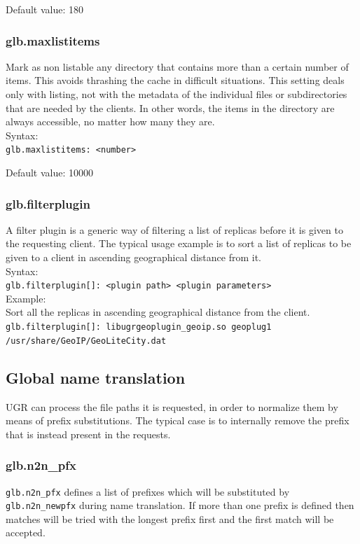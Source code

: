 \documentclass[12pt]{article} %
\begin{document}
Default value: 180

\subsubsection{glb.maxlistitems}
Mark as non listable any directory that contains more than a certain number of items. This avoids thrashing the cache in difficult situations. This setting deals only with listing, not with the metadata of the individual files or subdirectories that are needed by the clients. In other words, the items in the directory are always accessible, no matter how many they are.\\
Syntax:\\
\lstinline"glb.maxlistitems: <number>"


Default value: 10000

\subsubsection{glb.filterplugin}
A filter plugin is a generic way of filtering a list of replicas before it is given to the requesting client.
The typical usage example is to sort a list of replicas to be given to a client in ascending geographical distance from it.
\\
Syntax:\\
\lstinline"glb.filterplugin[]: <plugin path> <plugin parameters>"
\\
Example:\\
Sort all the replicas in ascending geographical distance from the client.
\lstinline"glb.filterplugin[]: libugrgeoplugin_geoip.so geoplug1 /usr/share/GeoIP/GeoLiteCity.dat"

\subsection{\label{globalxlation}Global name translation}

UGR can process the file paths it is requested, in order to normalize them by means of prefix substitutions. The typical case is to internally remove the prefix that is instead present in the requests.

\subsubsection{glb.n2n\_pfx}

\lstinline"glb.n2n_pfx" defines a list of prefixes which will be substituted by \lstinline"glb.n2n_newpfx" during name translation. If more than one prefix is defined then matches will be tried with the longest prefix first and the first match will be accepted.
\end{document}

